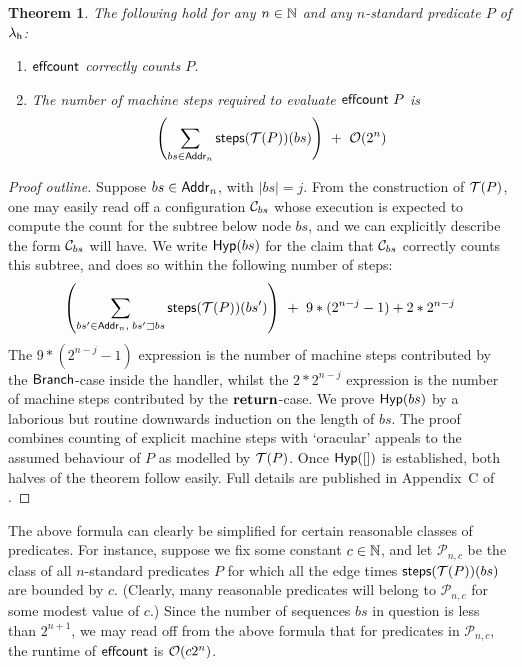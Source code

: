 \documentclass[12pt,phd,lfcs,twoside,openright,logo,leftchapter,normalheadings]{infthesis}
\theoremstyle{plain}
\newtheorem{theorem}{Theorem}[chapter]
\theoremstyle{definition}
\begin{document}
\begin{theorem}\label{thm:complexity-effectful-counting}
  The following hold for any $n \in \mathbb{N}$ and any $n$-standard predicate $P$ of $\lambda_{\mathsf{h}}$:
  \begin{enumerate}
  \item $\mathsf{effcount}$ correctly counts $P$.
  \item The number of machine steps required to evaluate $\mathsf{effcount}~P$ is
{
  \[
     \left( \displaystyle\sum_{bs \in \mathsf{Addr}_n} \mathsf{steps}(\mathcal{T}(P))(bs) \right) ~+~ \mathcal{O}(2^n)
  \]}%
\end{enumerate}
\end{theorem}
%
\begin{proof}[Proof outline]
  Suppose $bs \in \mathsf{Addr}_n$, with $|bs|=j$.  From the construction of
  $\mathcal{T}(P)$, one may easily read off a configuration $\mathcal{C}_{bs}$ whose
  execution is expected to compute the count for the subtree below
  node $bs$, and we can explicitly describe the form $\mathcal{C}_{bs}$ will
  have.  We write $\mathsf{Hyp}(bs)$ for the claim that $\mathcal{C}_{bs}$
  correctly counts this subtree, and does so within the following
  number of steps: {\small
  \[
     \left( \displaystyle\sum_{bs' \in \mathsf{Addr}_n,\; bs' \sqsupset bs} \mathsf{steps}(\mathcal{T}(P))(bs') \right) ~+~ 9 * (2^{n-j} - 1) + 2*2^{n-j}
  \]
}%
%
The $9*(2^{n-j}-1)$ expression is the number of machine steps
contributed by the $\mathsf{Branch}$-case inside the handler, whilst the
$2*2^{n-j}$ expression is the number of machine steps contributed by
the $\mathbf{return}$-case.
%
We prove $\mathsf{Hyp}(bs)$ by a laborious but routine downwards
induction on the length of $bs$. The proof combines counting of
explicit machine steps with `oracular' appeals to the assumed
behaviour of $P$ as modelled by $\mathcal{T}(P)$. Once
$\mathsf{Hyp}([])$ is established, both halves of the theorem
follow easily.
%
Full details are published in Appendix~C of \citet{HillerstromLL20a}.
\end{proof}
%

The above formula can clearly be simplified for certain reasonable
classes of predicates. For instance, suppose we fix some constant
$c \in \mathbb{N}$, and let $\mathcal{P}_{n,c}$ be the class of all
$n$-standard predicates $P$ for which all the edge times
$\mathsf{steps}(\mathcal{T}(P))(bs)$ are bounded by $c$. (Clearly, many reasonable
predicates will belong to $\mathcal{P}_{n,c}$ for some modest value of
$c$.) Since the number of sequences $bs$ in question is less than
$2^{n+1}$, we may read off from the above formula that for predicates
in $\mathcal{P}_{n,c}$, the runtime of $\mathsf{effcount}$ is $\mathcal{O}(c2^n)$.
\end{document}
